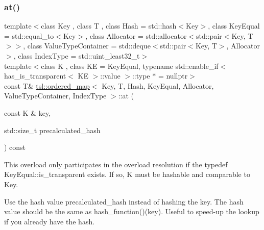 \subsubsection{\texorpdfstring{at()}{at()}\hspace{0.1cm}{\footnotesize\ttfamily [6/6]}}
{\footnotesize\ttfamily template$<$class Key , class T , class Hash  = std\+::hash$<$\+Key$>$, class Key\+Equal  = std\+::equal\+\_\+to$<$\+Key$>$, class Allocator  = std\+::allocator$<$std\+::pair$<$\+Key, T$>$$>$, class Value\+Type\+Container  = std\+::deque$<$std\+::pair$<$\+Key, T$>$, Allocator$>$, class Index\+Type  = std\+::uint\+\_\+least32\+\_\+t$>$ \\
template$<$class K , class KE  = Key\+Equal, typename std\+::enable\+\_\+if$<$ has\+\_\+is\+\_\+transparent$<$ K\+E $>$\+::value $>$\+::type $\ast$  = nullptr$>$ \\
const T\& \mbox{\hyperlink{classtsl_1_1ordered__map}{tsl\+::ordered\+\_\+map}}$<$ Key, T, Hash, Key\+Equal, Allocator, Value\+Type\+Container, Index\+Type $>$\+::at (\begin{DoxyParamCaption}\item[{const K \&}]{key,  }\item[{std\+::size\+\_\+t}]{precalculated\+\_\+hash }\end{DoxyParamCaption}) const\hspace{0.3cm}{\ttfamily [inline]}}





This overload only participates in the overload resolution if the typedef Key\+Equal\+::is\+\_\+transparent exists. If so, K must be hashable and comparable to Key.

Use the hash value \textquotesingle{}precalculated\+\_\+hash\textquotesingle{} instead of hashing the key. The hash value should be the same as hash\+\_\+function()(key). Useful to speed-\/up the lookup if you already have the hash. \mbox{\label{classtsl_1_1ordered__map_a872ba5948f124a365dac691057c344d4}} 
